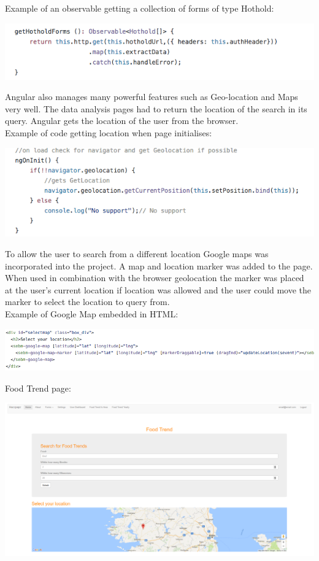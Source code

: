 Example of an observable getting a collection of forms of type Hothold:
\begin{center}    
    \includegraphics[width=140mm]{img/observable.png}
\end{center}

Angular also manages many powerful features such as Geo-location and Maps very well. The data analysis pages had to return the location of the search in its query. Angular gets the location of the user from the browser. \\

Example of code getting location when page initialises:
\begin{center}    
    \includegraphics[width=140mm]{img/geo.png}
\end{center}

To allow the user to search from a different location Google maps was incorporated into the project. A map and location marker was added to the page. When used in combination with the browser geolocation the marker was placed at the user’s current location if location was allowed and the user could move the marker to select the location to query from. \\
 
Example of Google Map embedded in HTML:
\begin{center}    
    \includegraphics[width=170mm]{img/map.png}
\end{center}

Food Trend page: \\
\begin{center}    
    \includegraphics[width=140mm]{img/web/foodtrend.png}
\end{center}

